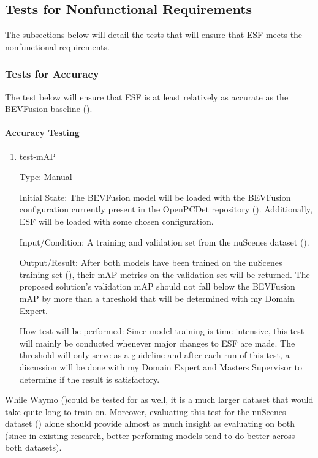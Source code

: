 \documentclass[12pt, titlepage]{article}
\newcommand{\ProjectName}{ESF }
\begin{document}
\subsection{Tests for Nonfunctional Requirements}
The subsections below will detail the tests that will ensure that \ProjectName{}meets the nonfunctional requirements.

\subsubsection{Tests for Accuracy}

The test below will ensure that \ProjectName{}is at least relatively as accurate as the BEVFusion baseline (\cite{liang2022bevfusion}).
		
\paragraph{Accuracy Testing}

\begin{enumerate}

\item{test-mAP\\}

Type: Manual
					
Initial State: The BEVFusion model will be loaded with the BEVFusion configuration currently present in the OpenPCDet repository (\cite{openpcdet2020}).
Additionally, \ProjectName{}will be loaded with some chosen configuration.
					
Input/Condition: A training and validation set from the nuScenes dataset (\cite{caesar2020nuscenes}).
					
Output/Result: After both models have been trained on the nuScenes training set (\cite{caesar2020nuscenes}), their mAP metrics on the validation set will be returned. The
proposed solution's validation mAP should not fall below the BEVFusion mAP by more than a threshold that will be determined with my Domain Expert.
					
How test will be performed: Since model training is time-intensive, this test will mainly be conducted whenever major changes to \ProjectName{}are made.
The threshold will only serve as a guideline and after each run of this test, a discussion will be done with my Domain Expert and Masters Supervisor to determine
if the result is satisfactory.

\end{enumerate}

While Waymo (\cite{sun2020scalability})could be tested for as well, it is a much larger dataset that would take quite long to train on. Moreover, evaluating this test for the nuScenes dataset (\cite{caesar2020nuscenes})
alone should provide almost as much insight as evaluating on both (since in existing research, better performing models tend to do better across both datasets).
\end{document}
